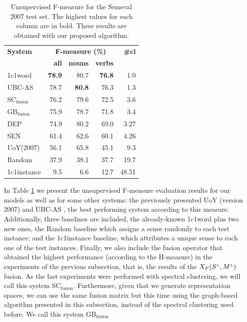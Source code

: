 \begin{table}[!htb]
\centering
\caption{Unsupervised F-measure for the Semeval 2007 test set. The highest values for each column are in bold. These results are obtained with our proposed algorithm.}
\begin{tabular}{@{}lrrrr@{}}
\toprule
\textbf{System} & \multicolumn{3}{c}{\textbf{F-measure (\%)}} & \textbf{\#cl} \\
 & \textbf{all} & \textbf{nouns} & \textbf{verbs} & \\ \midrule
1c1word          & \textbf{78.9}         & 80.7           & \textbf{76.8}           & 1.0             \\
UBC-AS           & 78.7         & \textbf{80.8}           & 76.3           & 1.3          \\
SC$_{\text{fusion}}$     & 76.2         & 79.6           & 72.5           & 3.6          \\
GB$_{\text{fusion}}$     & 75.9         & 78.7           & 71.8           & 3.4          \\
DEP     & 74.9         & 80.2           & 69.0           & 3.27          \\
SEN     & 61.4         & 62.6           & 60.1           & 4.26         \\
UoY(2007)        & 56.1         & 65.8           & 45.1           & 9.3          \\
Random           & 37.9         & 38.1           & 37.7           & 19.7             \\
1c1instance & 	9.5         & 6.6           & 12.7           & 48.51             \\ \bottomrule
\end{tabular}

\label{tab:sem2007_unsup_FS}
\end{table}

In Table \ref{tab:sem2007_unsup_FS} we present the unsupervised F-measure evaluation results for our models as well as for some other systems: the previously presented UoY (version 2007) and UBC-AS \cite{Agirre2007UBC}, the best performing system according to this measure. Additionally, three baselines are included, the already-known 1c1word plus two new ones, the Random  baseline which assigns a sense randomly to each test instance; and the 1c1instance baseline, which attributes a unique sense to each one of the test instances. Finally, we also include the fusion operator that obtained the highest performance (according to the H-measure) in the experiments of the previous subsection, that is, the results of the $X_F(S^{\scriptscriptstyle L},M^{\scriptscriptstyle L})$ fusion. As the last experiments were performed with spectral clustering, we will call this system SC$_\text{fusion}$. Furthermore, given that we generate representation spaces, we can use the same fusion matrix but this time using the graph-based algorithm presented in this subsection, instead of the spectral clustering used before. We call this system GB$_{\text{fusion}}$

